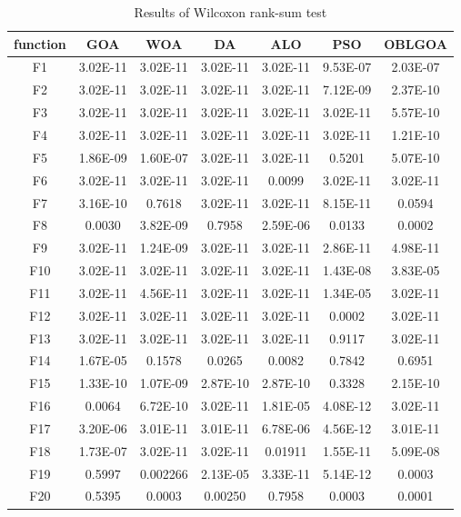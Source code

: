 \begin{table}%
    \centering
    \caption{Results of Wilcoxon rank-sum test}\label{tab:results_wilcoxon_rank_sum_test_IGOA}
    \renewcommand\arraystretch{1.3} 


    \begin{tabular}{*{7}{c}}
    \hline
    function&GOA&WOA&DA&ALO&PSO&OBLGOA\\
    \hline
 
    {F1}& 3.02E-11&3.02E-11&3.02E-11&3.02E-11&9.53E-07&2.03E-07\\\hline
    {F2}& 3.02E-11&3.02E-11&3.02E-11&3.02E-11&7.12E-09&2.37E-10\\\hline
    {F3}& 3.02E-11&3.02E-11&3.02E-11&3.02E-11&3.02E-11&5.57E-10\\\hline
    {F4}& 3.02E-11&3.02E-11&3.02E-11&3.02E-11&3.02E-11&1.21E-10\\\hline
    {F5}& 1.86E-09&1.60E-07&3.02E-11&3.02E-11&0.5201&5.07E-10\\\hline
    {F6}& 3.02E-11&3.02E-11&3.02E-11&0.0099&3.02E-11&3.02E-11\\\hline
    {F7}& 3.16E-10&0.7618&3.02E-11&3.02E-11&8.15E-11&0.0594\\\hline
    {F8}& 0.0030&3.82E-09&0.7958&2.59E-06&0.0133&0.0002\\\hline
    {F9}& 3.02E-11&1.24E-09&3.02E-11&3.02E-11&2.86E-11&4.98E-11\\\hline
    {F10}& 3.02E-11&3.02E-11&3.02E-11&3.02E-11&1.43E-08&3.83E-05\\\hline
    {F11}& 3.02E-11&4.56E-11&3.02E-11&3.02E-11&1.34E-05&3.02E-11\\\hline
    {F12}& 3.02E-11&3.02E-11&3.02E-11&3.02E-11&0.0002&3.02E-11\\\hline
    {F13}& 3.02E-11&3.02E-11&3.02E-11&3.02E-11&0.9117&3.02E-11\\\hline
    {F14}& 1.67E-05&0.1578&0.0265&0.0082&0.7842&0.6951\\\hline
    {F15}& 1.33E-10&1.07E-09&2.87E-10&2.87E-10&0.3328&2.15E-10\\\hline
    {F16}& 0.0064&6.72E-10&3.02E-11&1.81E-05&4.08E-12&3.02E-11\\\hline
    {F17}& 3.20E-06&3.01E-11&3.01E-11&6.78E-06&4.56E-12&3.01E-11\\\hline
    {F18}& 1.73E-07&3.02E-11&3.02E-11&0.01911&1.55E-11&5.09E-08\\\hline
    {F19}& 0.5997&0.002266&2.13E-05&3.33E-11&5.14E-12&0.0003\\\hline
    {F20}& 0.5395&0.0003&0.00250&0.7958&0.0003&0.0001\\\hline
    \end{tabular}
\end{table}
